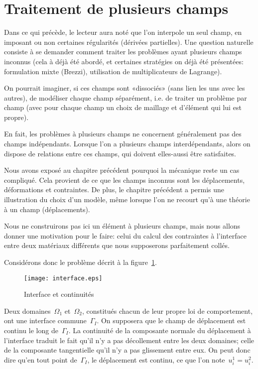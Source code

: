 \medskip
\section{Traitement de plusieurs champs}\label{Sec-interf}
Dans ce qui précède, le lecteur aura noté que l'on interpole un seul champ, en imposant ou non certaines régularités (dérivées partielles).
Une question naturelle consiste à se demander comment traiter les problèmes ayant plusieurs champs inconnus (cela à déjà été abordé, et certaines stratégies on déjà été présentées: formulation mixte (Brezzi), utilisation de multiplicateurs de Lagrange).

On pourrait imaginer, si ces champs sont «dissociés» (sans lien les uns avec les autres), de modéliser chaque champ séparément, i.e. de traiter un problème par champ (avec pour chaque champ un choix de maillage et d'élément qui lui est propre).

En fait, les problèmes à plusieurs champs ne concernent généralement pas des champs indépendants. Lorsque l'on a plusieurs champs interdépendants, alors on dispose de relations entre ces champs, qui doivent elles-aussi être satisfaites.

\medskip
Nous avons exposé au chapitre précédent pourquoi la mécanique reste un cas compliqué. Cela provient de ce que les champs inconnus sont les déplacements, déformations et contraintes. De plus, le chapitre précédent a permis une illustration du choix d'un modèle, même lorsque l'on ne recourt qu'à une théorie à un champ (déplacements).

Nous ne construirons pas ici un élément à plusieurs champs, mais nous allons donner une motivation pour le faire: celui du calcul des contraintes à l'interface entre deux matériaux différents que nous supposerons parfaitement collés.

\medskip
Considérons donc le problème décrit à la figure~\ref{interf}.
\begin{figure}[h!]
\centering
\texttt{[image: interface.eps]}
\caption{Interface et continuités}\label{interf}
\end{figure}
Deux domaines~$\Omega_1$ et~$\Omega_2$, constitués chacun de leur propre loi de comportement, ont une interface commune~$\Gamma_I$. On supposera que le champ de déplacement est continu le long de~$\Gamma_I$. La continuité de la composante normale du déplacement à l'interface traduit le fait qu'il n'y a pas décollement entre les deux domaines; celle de la composante tangentielle qu'il n'y a pas glissement entre eux.
On peut donc dire qu'en tout point de~$\Gamma_I$, le déplacement est continu, ce que l'on note~$u_i^1=u_i^2$.


